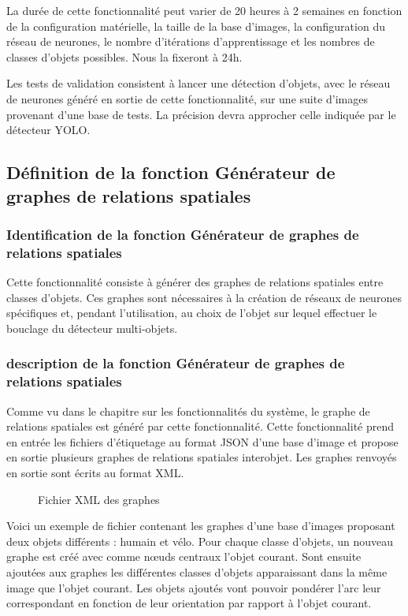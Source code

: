 \documentclass[debug,nodate,hideweeklyreports,noposter]{polytech/polytech}
\begin{document}
La durée de cette fonctionnalité peut varier de 20 heures à 2 semaines en fonction de la configuration matérielle, la taille de la base d'images, la configuration du réseau de neurones, le nombre d’itérations d’apprentissage et les nombres de classes d’objets possibles. Nous la fixeront à 24h.

Les tests de validation consistent à lancer une détection d'objets, avec le réseau de neurones généré en sortie de cette fonctionnalité, sur une suite d'images provenant d'une base de tests. La précision devra approcher celle indiquée par le détecteur YOLO.

\subsection{Définition de la fonction Générateur de graphes de relations spatiales}

\subsubsection{Identification de la fonction Générateur de graphes de relations spatiales}

Cette fonctionnalité consiste à générer des graphes de relations spatiales entre classes d’objets. Ces graphes sont nécessaires à la création de réseaux de neurones spécifiques et, pendant l’utilisation, au choix de l’objet sur lequel effectuer le bouclage du détecteur multi-objets.

\subsubsection{description de la fonction Générateur de graphes de relations spatiales}

Comme vu dans le chapitre sur les fonctionnalités du système, le graphe de relations spatiales est généré par cette fonctionnalité.
Cette fonctionnalité prend en entrée les fichiers d’étiquetage au format JSON d’une base d’image et propose en sortie plusieurs graphes de relations spatiales interobjet. Les graphes renvoyés en sortie sont écrits au format XML. 

\begin{figure}
  \caption{Fichier XML des graphes}
  \label{fig:graphxml}
\end{figure}

Voici un exemple de fichier contenant les graphes d’une base d’images proposant deux objets différents : humain et vélo.
Pour chaque classe d’objets, un nouveau graphe est créé avec comme nœuds centraux l’objet courant. Sont ensuite ajoutées aux graphes les différentes classes d’objets apparaissant dans la même image que l’objet courant. Les objets ajoutés vont pouvoir pondérer l’arc leur correspondant en fonction de leur orientation par rapport à l’objet courant.
\end{document}
